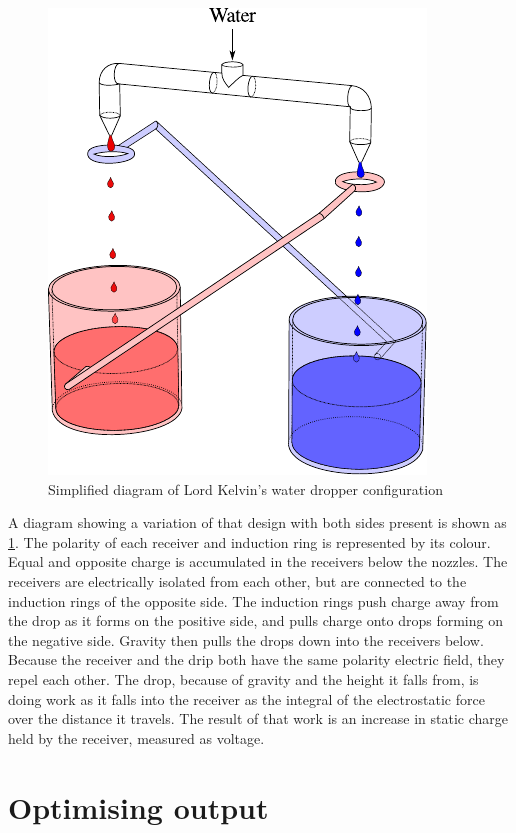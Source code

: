   \begin{figure}
      \centering
      \includegraphics{content/appendices/chargedWaterDrops/graphics/DripperOut}
      \caption{\label{Fig_Diagram_KelvinWaterDripper}Simplified diagram of Lord Kelvin's water dropper configuration}
  \end{figure}
  A diagram showing a variation of that design with both sides present is shown as \cref{Fig_Diagram_KelvinWaterDripper}.
  The polarity of each receiver and induction ring is represented by its colour.
  Equal and opposite charge is accumulated in the receivers below the nozzles.
  The receivers are electrically isolated from each other, but are connected to the induction rings of the opposite side.
  The induction rings push charge away from the drop as it forms on the positive side, and pulls charge onto drops forming on the negative side.
  Gravity then pulls the drops down into the receivers below.
  Because the receiver and the drip both have the same polarity electric field, they repel each other.
  The drop, because of gravity and the height it falls from, is doing work as it falls into the receiver as the integral of the electrostatic force over the distance it travels.
  The result of that work is an increase in static charge held by the receiver, measured as voltage.


\section{Optimising output}

